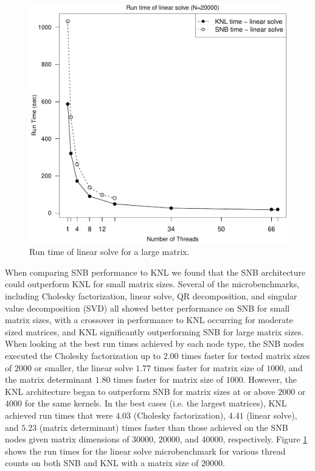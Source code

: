 \begin{figure}
\includegraphics[height=\columnwidth, width=\columnwidth]{linsolve_20000_68-rt.pdf}
\caption{Run time of linear solve for a large matrix.}
\label{fig:largeLinsolveTime}
\end{figure}

When comparing SNB performance to KNL we found that the SNB architecture could outperform
KNL for small matrix sizes. Several of the microbenchmarks, including Cholesky
factorization, linear solve, QR decomposition, and singular value decomposition (SVD) all
showed better performance on SNB for small matrix sizes, with a crossover in performance
to KNL occurring for moderate sized matrices, and KNL significantly outperforming SNB for
large matrix sizes. When looking at the best run times achieved by each node type, the SNB
nodes executed the Cholesky factorization up to $2.00$ times faster for tested matrix
sizes of $2000$ or smaller, the linear solve $1.77$ times faster for matrix size of
$1000$, and the matrix determinant $1.80$ times faster for matrix size of $1000$. However,
the KNL architecture began to outperform SNB for matrix sizes at or above $2000$ or $4000$
for the same kernels. In the best cases (i.e. the largest matrices), KNL achieved run
times that were $4.03$ (Cholesky factorization), $4.41$ (linear solve), and $5.23$ (matrix
determinant) times faster than those achieved on the SNB nodes given matrix dimensions of
$30000$, $20000$, and $40000$, respectively. Figure \ref{fig:largeLinsolveTime} shows the
run times for the linear solve microbenchmark for various thread counts on both SNB and
KNL with a matrix size of $20000$.

